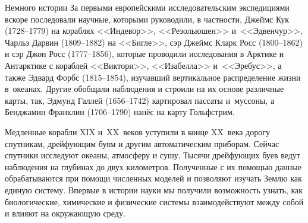 \begin{chapter}{Немного истории}
За первыми европейскими исследовательским экспедициями вскоре
последовали научные, которыми руководили, в частности,
Джеймс Кук (1728--1779) на кораблях <<Индевор>>, <<Резольюшен>> 
и~<<Эдвенчур>>,
Чарльз Дарвин (1809--1882) на <<Бигле>>, сэр Джеймс Кларк Росс (1800--1862)
и сэр Джон Росс (1777--1856), которые проводили исследования в Арктике 
и Антарктике с кораблей <<Виктори>>, <<Изабелла>> и~<<Эребус>>, а также 
Эдвард Форбс (1815--1854), изучавший вертикальное распределение жизни 
в~океанах. Другие обобщали наблюдения и строили на их основе различные карты,
так, Эдмунд Галлей (1656--1742) картировал пассаты и~муссоны, 
а Бенджамин Франклин (1706--1790) нанёс на карту Гольфстрим.
%

Медленные корабли XIX и~XX~веков уступили в конце XX~века дорогу
спутникам, дрейфующим буям и другим автоматическим приборам. 
Сейчас спутники исследуют океаны, атмосферу и сушу. Тысячи дрейфующих буев
ведут наблюдения на глубинах до двух километров. Полученные с их помощью
данные обрабатываются при помощи численных моделей и позволяют изучать Землю как
единую систему. Впервые в истории науки мы получили возможность узнать, 
как биологические, химические и физические системы взаимодействуют между 
собой и влияют на окружающую среду.
%


\end{chapter}
